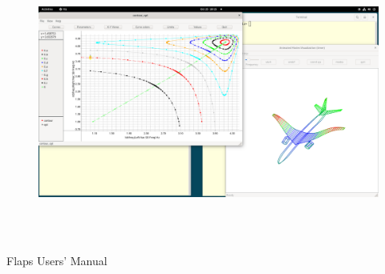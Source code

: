 \documentclass[11pt,openany,twoside]{book}
\numberwithin{equation}{section}		%
\begin{document}
\begin{center}
\begin{figure}[ht]	%
		\includegraphics[height=9cm,width=16cm]{viz-amviz.png}
	\centering
\end{figure}
\vspace{2cm}
\Huge{Flaps Users' Manual}


\end{center}
\end{document}
